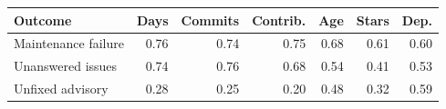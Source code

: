 \begin{tabular}{lrrrrrr}
\toprule
Outcome & Days & Commits & Contrib. & Age & Stars & Dep. \\
\midrule
Maintenance failure & 0.76 & 0.74 & 0.75 & 0.68 & 0.61 & 0.60 \\
Unanswered issues & 0.74 & 0.76 & 0.68 & 0.54 & 0.41 & 0.53 \\
Unfixed advisory & 0.28 & 0.25 & 0.20 & 0.48 & 0.32 & 0.59 \\
\bottomrule
\end{tabular}
